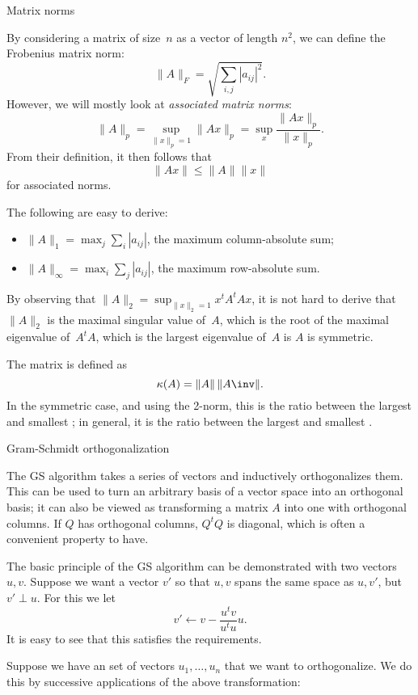 
 {Matrix norms}

By considering a matrix of size~$n$ as a vector of length $n^2$, we
can define the Frobenius matrix norm:
\[ \|A\|_F=\sqrt{\sum_{i,j}|a_{ij}|^2}. \]
However, we will mostly look at \emph{associated matrix
  norms}:
\[ \|A\|_p=\sup_{\|x\|_p=1}\|Ax\|_p=
   \sup_x\frac{\|Ax\|_p}{\|x\|_p}.
\]
From their definition, it then follows that 
\[ \|Ax\|\leq\|A\|\|x\| \]
for associated norms.

The following are easy to derive:
\begin{itemize}
\item $\|A\|_1=\max_j\sum_i|a_{ij}|$, the maximum column-absolute sum;
\item $\|A\|_\infty=\max_i\sum_j|a_{ij}|$, the maximum row-absolute sum.
\end{itemize}
By observing that $\|A\|_2=\sup_{\|x\|_2=1} x^tA^tAx$, it is not hard
to derive that $\|A\|_2$ is the maximal singular value of~$A$,
which
is the root of the maximal eigenvalue of~$A^tA$,
which is the largest eigenvalue of~$A$ is $A$ is symmetric.

The matrix  is defined as
\[ \kappa(A)=\|A\|\,\|A\inv\|. \]
In the symmetric case, and using the 2-norm, this is the ratio between the largest and
smallest ;
in general, it is the ratio between the largest and smallest .


 {Gram-Schmidt orthogonalization}
\label{app:gram-schmidt}

The \acf{GS} algorithm takes a series of vectors and inductively
orthogonalizes them. This can be used to turn an arbitrary basis of a
vector space into an orthogonal basis; it can also be viewed as
transforming a matrix $A$ into one with orthogonal columns. If $Q$ has
orthogonal columns, $Q^tQ$ is diagonal, which is often a convenient
property to have.

The basic principle of the \ac{GS} algorithm
can be demonstrated with two
vectors~$u,v$. Suppose we want a vector $v'$
so that $u,v$ spans the same space as $u,v'$,
but $v'\perp u$.
For this we let
\[ v'\leftarrow v-\frac{u^tv}{u^tu}u. \]
It is easy to see that this satisfies the requirements.

Suppose we have an set of vectors
$u_1,\ldots,u_n$ that we want to orthogonalize. We do this by
successive applications of the above transformation:


